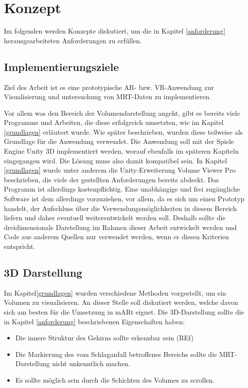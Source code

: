 
\chapter{Konzept}
\label{konzept}

Im folgenden werden Konzepte diskutiert, um die in Kapitel \ref{anforderung} herausgearbeiteten Anforderungen zu erfüllen.

\section{Implementierungsziele}
Ziel des Arbeit ist es eine prototypische AR- bzw. VR-Anwendung zur Visualisierung und untersuchung von MRT-Daten zu implementieren. 

Vor allem was den Bereich der Volumendarstellung angeht, gibt es bereits viele Programme und Arbeiten, die diese erfolgreich umsetzten, wie im Kapitel \ref{grundlagen} erläutert wurde.
Wie später beschrieben, wurden diese teilweise als Grundlage für die Anwendung verwendet. Die Anwendung soll mit der Spiele Engine Unity 3D implementiert werden, worauf ebenfalls im späteren Kapiteln eingegangen wird. Die Lösung muss also damit kompatibel sein. In Kapitel \ref{grundlagen} wurde unter anderem die Unity-Erweiterung Volume Viewer Pro beschrieben, die viele der gestellten Anforderungen bereits abdeckt. Das Programm ist allerdings kostenpflichtig. Eine unabhängige und frei zugängliche Software ist dem allerdings vorzuziehen, vor allem, da es sich um einen Prototyp handelt, der Aufschluss über die Verwendungsmöglichkeiten in diesem Bereich liefern und daher eventuell weiterentwickelt werden soll. Deshalb sollte die dreidimensionale Darstellung im Rahmen dieser Arbeit entwickelt werden und Code aus anderem Quellen nur verwendet werden, wenn er diesen Kriterien entspricht.

\section{3D Darstellung}

Im Kapitel\ref{grundlagen} wurden verschiedene Methoden vorgestellt, um ein Volumen zu visualisieren. An dieser Stelle soll diskutiert werden, welche davon sich am besten für die Umsetzung in mARt eignet.
Die 3D-Darstellung sollte die in Kapitel \ref{anforderung} beschriebenen Eigenschaften haben:

\begin{itemize}
\item Die innere Struktur des Gehirns sollte erkennbar sein (REf)
\item Die Markierung des vom Schlaganfall betroffenes Bereichs sollte die MRT-Darstellung nicht unkenntlich machen.
\item Es sollte möglich sein durch die Schichten des Volumes zu scrollen. 
\end{itemize}

